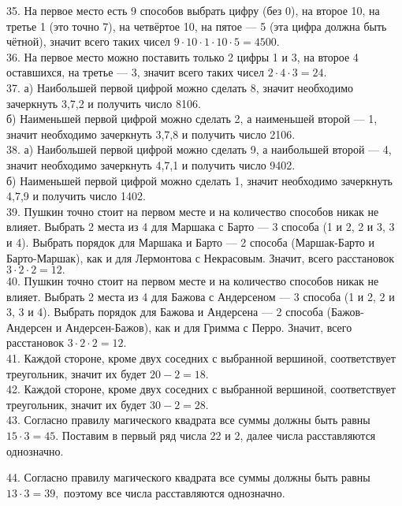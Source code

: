 35. На первое место есть 9 способов выбрать цифру (без 0), на второе 10, на третье 1 (это точно 7), на четвёртое 10, на пятое --- 5 (эта цифра должна быть чётной), значит всего таких чисел $9\cdot10\cdot1\cdot10\cdot5=4500.$\\
36. На первое место можно поставить только 2 цифры 1 и 3, на второе 4 оставшихся, на третье --- 3, значит всего таких чисел $2\cdot4\cdot3=24.$\\
37. а) Наибольшей первой цифрой можно сделать 8, значит необходимо зачеркнуть 3,7,2 и получить число 8106.\\
б) Наименьшей первой цифрой можно сделать 2, а наименьшей второй --- 1, значит необходимо зачеркнуть 3,7,8 и получить число 2106.\\
38. а) Наибольшей первой цифрой можно сделать 9, а наибольшей второй --- 4, значит необходимо зачеркнуть 4,7,1 и получить число 9402.\\
б) Наименьшей первой цифрой можно сделать 1, значит необходимо зачеркнуть 4,7,9 и получить число 1402.\\
39. Пушкин точно стоит на первом месте и на количество способов никак не влияет. Выбрать 2 места из 4 для Маршака с Барто --- 3 способа (1 и 2, 2 и 3, 3 и 4). Выбрать порядок для Маршака и Барто --- 2 способа (Маршак-Барто и Барто-Маршак), как и для  Лермонтова с Некрасовым. Значит, всего расстановок $3\cdot2\cdot2=12.$\\
40. Пушкин точно стоит на первом месте и на количество способов никак не влияет. Выбрать 2 места из 4 для Бажова с Андерсеном --- 3 способа (1 и 2, 2 и 3, 3 и 4). Выбрать порядок для Бажова и Андерсена --- 2 способа (Бажов-Андерсен и Андерсен-Бажов), как и для  Гримма с Перро. Значит, всего расстановок $3\cdot2\cdot2=12.$\\
41. Каждой стороне, кроме двух соседних с выбранной вершиной, соответствует треугольник, значит их будет $20-2=18.$\\
42. Каждой стороне, кроме двух соседних с выбранной вершиной, соответствует треугольник, значит их будет $30-2=28.$\\
43. Согласно правилу магического квадрата все суммы должны быть равны $15\cdot3=45.$ Поставим в первый ряд числа 22 и 2, далее числа расставляются однозначно.
\begin{center}
\begin{figure}[ht!]
\end{figure}
\end{center}
44. Согласно правилу магического квадрата все суммы должны быть равны $13\cdot3=39,$ поэтому все числа расставляются однозначно.
